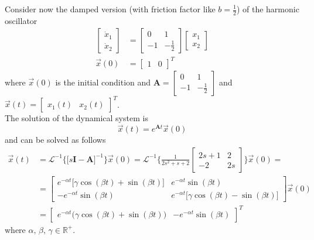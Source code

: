 \documentclass[11pt,a4paper,oneside]{book}
\numberwithin{equation}{section}
\theoremstyle{it}
\theoremstyle{definition}
\begin{document}
Consider now the damped version (with friction factor like $b=\frac{1}{2}$) of 
the harmonic oscillator 
\begin{equation}
	\begin{aligned}
		\begin{bmatrix} \dot{x}_1 \\ \dot{x}_2 \end{bmatrix} &= \begin{bmatrix} 
		0 & 1 \\ -1 & -\frac{1}{2} \end{bmatrix} \begin{bmatrix} {x}_1 \\ {x}_2 
		\end{bmatrix} \\[6pt]
		\vec{x}(0) &= \begin{bmatrix} 1 & 0 \end{bmatrix}^T
	\end{aligned}
\end{equation}
where $\vec{x}(0)$ is the initial condition and $\mathbf{A} = \begin{bmatrix} 0 
& 1 \\ -1 & -\frac{1}{2} \end{bmatrix}$ and $\vec{x}(t)= \begin{bmatrix} x_1(t) 
& x_2(t) \end{bmatrix}^T$.\\

The solution of the dynamical system is
\begin{equation}
	\vec{x}(t) = e^{\mathbf{A}t}\vec{x}(0)
\end{equation}
and can be solved as follows
\begin{equation}
	\begin{aligned}
		\vec{x}(t) &= 
		\mathcal{L}^{-1}\Big\{\Big[s\mathbf{I}-\mathbf{A}\Big]^{-1}\Big\}\vec{x}(0)
		 = \mathcal{L}^{-1}\Big\{\frac{1}{2s^2+s+2}\begin{bmatrix} 2s+1 & 2 \\ 
		-2 & 2s \end{bmatrix}\Big\}\vec{x}(0) = \\[6pt]
		&= \begin{bmatrix} e^{-\alpha t}\Big[\gamma \cos(\beta t)+\sin(\beta 
		t)\Big] & e^{-\alpha t}\sin(\beta t) \\ -e^{-\alpha t}\sin(\beta t) & 
		e^{-\alpha t}\Big[\gamma \cos(\beta t)-\sin(\beta t)\Big] 
		\end{bmatrix}\vec{x}(0) \\[6pt]
		&= \begin{bmatrix} e^{-\alpha t}\Big(\gamma \cos(\beta t)+\sin(\beta 
		t)\Big) & -e^{-\alpha t}\sin(\beta t) \end{bmatrix}^T
	\end{aligned}
\end{equation}
where $\alpha,\,\beta,\,\gamma\in\mathbb{R}^+$.
\end{document}
